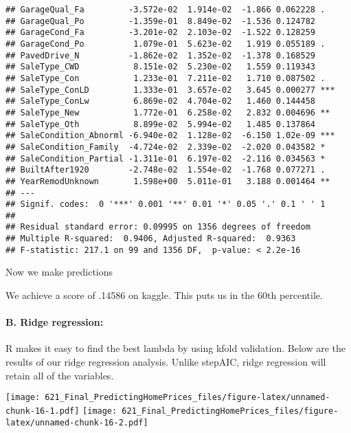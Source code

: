 \documentclass[
]{article}
\begin{document}
\begin{verbatim}
## GarageQual_Fa         -3.572e-02  1.914e-02  -1.866 0.062228 .  
## GarageQual_Po         -1.359e-01  8.849e-02  -1.536 0.124782    
## GarageCond_Fa         -3.201e-02  2.103e-02  -1.522 0.128259    
## GarageCond_Po          1.079e-01  5.623e-02   1.919 0.055189 .  
## PavedDrive_N          -1.862e-02  1.352e-02  -1.378 0.168529    
## SaleType_CWD           8.151e-02  5.230e-02   1.559 0.119343    
## SaleType_Con           1.233e-01  7.211e-02   1.710 0.087502 .  
## SaleType_ConLD         1.333e-01  3.657e-02   3.645 0.000277 ***
## SaleType_ConLw         6.869e-02  4.704e-02   1.460 0.144458    
## SaleType_New           1.772e-01  6.258e-02   2.832 0.004696 ** 
## SaleType_Oth           8.899e-02  5.994e-02   1.485 0.137864    
## SaleCondition_Abnorml -6.940e-02  1.128e-02  -6.150 1.02e-09 ***
## SaleCondition_Family  -4.724e-02  2.339e-02  -2.020 0.043582 *  
## SaleCondition_Partial -1.311e-01  6.197e-02  -2.116 0.034563 *  
## BuiltAfter1920        -2.748e-02  1.554e-02  -1.768 0.077271 .  
## YearRemodUnknown       1.598e+00  5.011e-01   3.188 0.001464 ** 
## ---
## Signif. codes:  0 '***' 0.001 '**' 0.01 '*' 0.05 '.' 0.1 ' ' 1
## 
## Residual standard error: 0.09995 on 1356 degrees of freedom
## Multiple R-squared:  0.9406, Adjusted R-squared:  0.9363 
## F-statistic: 217.1 on 99 and 1356 DF,  p-value: < 2.2e-16
\end{verbatim}

Now we make predictions

We achieve a score of .14586 on kaggle. This puts us in the 60th
percentile.

\hypertarget{b.-ridge-regression}{%
\paragraph{B. Ridge regression:}\label{b.-ridge-regression}}

R makes it easy to find the best lambda by using kfold validation. Below
are the results of our ridge regression analysis. Unlike stepAIC, ridge
regression will retain all of the variables.

\texttt{[image: 621\_Final\_PredictingHomePrices\_files/figure-latex/unnamed-chunk-16-1.pdf]}
\texttt{[image: 621\_Final\_PredictingHomePrices\_files/figure-latex/unnamed-chunk-16-2.pdf]}
\end{document}
